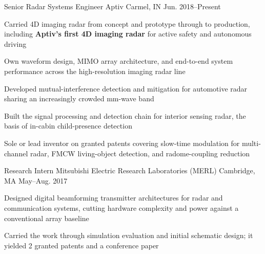 %
%


\begin{cventries}

    \cventry
        {Senior Radar Systems Engineer}
        {Aptiv}
        {Carmel, IN}
        {Jun. 2018--Present}
        {
            \begin{cvitems}
                \item {Carried 4D imaging radar from concept and prototype through to production, including \textbf{Aptiv's first 4D imaging radar} for active safety and autonomous driving}
                \item {Own waveform design, MIMO array architecture, and end-to-end system performance across the high-resolution imaging radar line}
                \item {Developed mutual-interference detection and mitigation for automotive radar sharing an increasingly crowded mm-wave band}
                \item {Built the signal processing and detection chain for interior sensing radar, the basis of in-cabin child-presence detection}
                \item {Sole or lead inventor on granted patents covering slow-time modulation for multi-channel radar, FMCW living-object detection, and radome-coupling reduction}
            \end{cvitems}
        }

    \cventry
        {Research Intern}
        {Mitsubishi Electric Research Laboratories (MERL)}
        {Cambridge, MA}
        {May--Aug. 2017}
        {
            \begin{cvitems}
                \item {Designed digital beamforming transmitter architectures for radar and communication systems, cutting hardware complexity and power against a conventional array baseline}
                \item {Carried the work through simulation evaluation and initial schematic design; it yielded 2 granted patents and a conference paper}
            \end{cvitems}
        }

\end{cventries}

